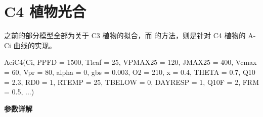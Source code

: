 \documentclass[
]{krantz}
\makeatletter
\newenvironment{Shaded}{\begin{snugshade}}{\end{snugshade}}
\newcommand{\AttributeTok}[1]{\textcolor[rgb]{0.77,0.63,0.00}{#1}}
\newcommand{\DecValTok}[1]{\textcolor[rgb]{0.00,0.00,0.81}{#1}}
\newcommand{\FloatTok}[1]{\textcolor[rgb]{0.00,0.00,0.81}{#1}}
\newcommand{\FunctionTok}[1]{\textcolor[rgb]{0.00,0.00,0.00}{#1}}
\newcommand{\NormalTok}[1]{#1}
\newenvironment{kframe}{%
\medskip{}
\setlength{\fboxsep}{.8em}
 \def\at@end@of@kframe{}%
 \ifinner\ifhmode%
  \def\at@end@of@kframe{\end{minipage}}%
  \begin{minipage}{\columnwidth}%
 \fi\fi%
 \def\FrameCommand##1{\hskip\@totalleftmargin \hskip-\fboxsep
 \colorbox{shadecolor}{##1}\hskip-\fboxsep
     \hskip-\linewidth \hskip-\@totalleftmargin \hskip\columnwidth}%
 \MakeFramed {\advance\hsize-\width
   \@totalleftmargin\z@ \linewidth\hsize
   \@setminipage}}%
 {\par\unskip\endMakeFramed%
 \at@end@of@kframe}
\renewenvironment{Shaded}{\begin{kframe}}{\end{kframe}}
\makeatother
\begin{document}
\cleardoublepage

\hypertarget{c4}{%
\section{C4 植物光合}\label{c4}}

之前的部分模型全部为关于 C3 植物的拟合，而 \citet{Caemmerer2000Biochemical} 的方法，则是针对
C4 植物的 A-Ci 曲线的实现。

\begin{Shaded}
\begin{Highlighting}[]
\FunctionTok{AciC4}\NormalTok{(Ci, }\AttributeTok{PPFD =} \DecValTok{1500}\NormalTok{, }\AttributeTok{Tleaf =} \DecValTok{25}\NormalTok{, }\AttributeTok{VPMAX25 =} \DecValTok{120}\NormalTok{, }
      \AttributeTok{JMAX25 =} \DecValTok{400}\NormalTok{, }\AttributeTok{Vcmax =} \DecValTok{60}\NormalTok{, }\AttributeTok{Vpr =} \DecValTok{80}\NormalTok{, }
      \AttributeTok{alpha =} \DecValTok{0}\NormalTok{, }\AttributeTok{gbs =} \FloatTok{0.003}\NormalTok{, }\AttributeTok{O2 =} \DecValTok{210}\NormalTok{, }
      \AttributeTok{x =} \FloatTok{0.4}\NormalTok{, }\AttributeTok{THETA =} \FloatTok{0.7}\NormalTok{, }\AttributeTok{Q10 =} \FloatTok{2.3}\NormalTok{, }
      \AttributeTok{RD0 =} \DecValTok{1}\NormalTok{, }\AttributeTok{RTEMP =} \DecValTok{25}\NormalTok{, }\AttributeTok{TBELOW =} \DecValTok{0}\NormalTok{, }
      \AttributeTok{DAYRESP =} \DecValTok{1}\NormalTok{, }\AttributeTok{Q10F =} \DecValTok{2}\NormalTok{, }\AttributeTok{FRM =} \FloatTok{0.5}\NormalTok{, ...)}
\end{Highlighting}
\end{Shaded}

\textbf{参数详解}
\end{document}
